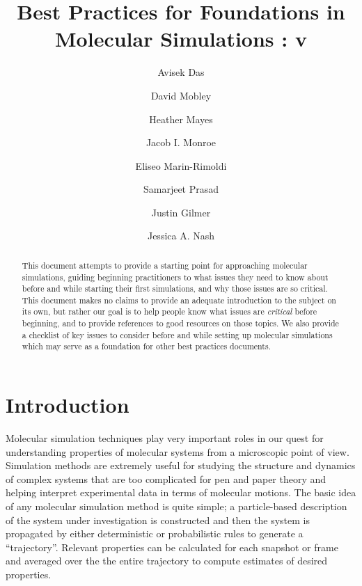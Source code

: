 \documentclass[9pt,bestpractices]{livecoms}
\title{Best Practices for Foundations in Molecular Simulations : v\versionnumber}
\author[1*]{Avisek Das}
\author[2]{David Mobley}
\author[1]{Heather Mayes}
\author[3]{Jacob I. Monroe}
\author[4]{Eliseo Marin-Rimoldi}
\author[5]{Samarjeet Prasad}
\author[6]{Justin Gilmer}
\author[7]{Jessica A. Nash}
\affil[1]{University of Michigan}
\affil[2]{University of California, Irvine}
\affil[3]{University of California, Santa Barbara}
\affil[4]{Univ 4}
\affil[5]{National Institutes of Standard and Technology}
\affil[6]{Univ 5}
\affil[7]{Univ 6}
\begin{document}
\begin{frontmatter}
\maketitle

\begin{abstract}
This document attempts to provide a starting point for approaching molecular simulations, guiding beginning practitioners to what issues they need to know about before and while starting their first simulations, and why those issues are so critical.
This document makes no claims to provide an adequate introduction to the subject on its own, but rather our goal is to help people know what issues are \emph{critical} before beginning, and to provide references to good resources on those topics. 
We also provide a checklist of key issues to consider before and while setting up molecular simulations which may serve as a foundation for other best practices documents. 
\end{abstract}
\end{frontmatter}


\todototoc
\listoftodos

\section{Introduction}


Molecular simulation techniques play very important roles in our quest for understanding properties of molecular systems from a microscopic point of view. Simulation methods are extremely useful for studying the structure and dynamics of complex systems that are too complicated for pen and paper theory and helping interpret experimental data in terms of molecular motions. The basic idea of any molecular simulation method is quite simple; a particle-based description of the system under investigation is constructed and then the system is propagated by either deterministic or probabilistic rules to generate a “trajectory”. Relevant properties can be calculated for each snapshot or frame and averaged over the the entire trajectory to compute estimates of desired properties. 
\end{document}
